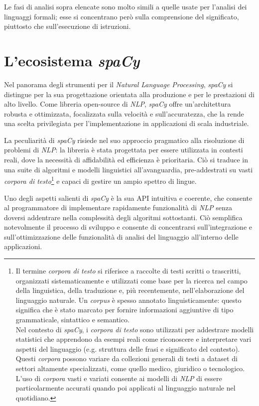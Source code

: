 \documentclass[12pt]{report}
\newcommand{\spacy}{\textsl{spaCy}\xspace}
\newcommand{\nlp}{\textsl{NLP}\xspace}
\newcommand{\api}{\textsf{API}\xspace}
\begin{document}
Le fasi di analisi sopra elencate sono molto simili a quelle usate per l'analisi dei linguaggi formali; esse si concentrano però sulla comprensione del significato, piuttosto che sull'esecuzione di istruzioni.


\section{L'ecosistema \spacy}
Nel panorama degli strumenti per il \textit{Natural Language Processing}, \spacy si distingue per la sua progettazione orientata alla produzione e per le prestazioni di alto livello. Come libreria open-source di \nlp, \spacy offre un'architettura robusta e ottimizzata, focalizzata sulla velocità e sull'accuratezza, che la rende una scelta privilegiata per l'implementazione in applicazioni di scala industriale.

La peculiarità di \spacy risiede nel suo approccio pragmatico alla risoluzione di problemi di \nlp: la libreria è stata progettata per essere utilizzata in contesti reali, dove la necessità di affidabilità ed efficienza è prioritaria. Ciò si traduce in una suite di algoritmi e modelli linguistici all'avanguardia, pre-addestrati su vasti \textit{corpora di testo}\footnote{Il termine \textit{corpora di testo} si riferisce a raccolte di testi scritti o trascritti, organizzati sistematicamente e utilizzati come base per la ricerca nel campo della linguistica, della traduzione e, più recentemente, nell'elaborazione del linguaggio naturale. Un \textit{corpus} è spesso annotato linguisticamente: questo significa che è stato marcato per fornire informazioni aggiuntive di tipo grammaticale, sintattico e semantico.\\
Nel contesto di \spacy, i \textit{corpora di testo} sono utilizzati per addestrare modelli statistici che apprendono da esempi reali come riconoscere e interpretare vari aspetti del linguaggio (e.g. struttura delle frasi e significato del contesto). Questi \textit{corpora} possono variare da collezioni generali di testi a dataset di settori altamente specializzati, come quello medico, giuridico o tecnologico. L'uso di \textit{corpora} vasti e variati consente ai modelli di \nlp di essere particolarmente accurati quando poi applicati al linguaggio naturale nel quotidiano.} e capaci di gestire un ampio spettro di lingue.

Uno degli aspetti salienti di \spacy è la sua \api intuitiva e coerente, che consente al programmatore di implementare rapidamente funzionalità di \nlp senza doversi addentrare nella complessità degli algoritmi sottostanti. Ciò semplifica notevolmente il processo di sviluppo e consente di concentrarsi sull'integrazione e sull'ottimizzazione delle funzionalità di analisi del linguaggio all'interno delle applicazioni.
\end{document}

